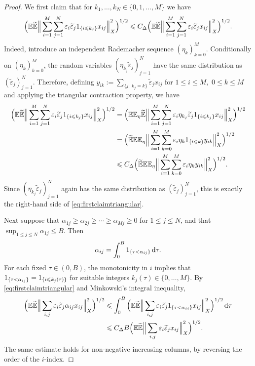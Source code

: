 \documentclass{amsart}
\let\leq\leqslant
\let\geq\geqslant
\theoremstyle{plain}
\theoremstyle{remark}
\theoremstyle{plain}
\numberwithin{equation}{section}
\newcommand{\E}{\mathbb E}
\newcommand{\1}{\mathbf 1}
\newcommand{\dd}{\,{\rm d}}
\newcommand{\wt}{\widetilde}
\begin{document}
\begin{proof}
We first claim that for  $k_1,\ldots,k_N\in\{0,1,\ldots,M\}$ we have 
\begin{equation}\label{eq:firstclaimtriangular}
       \Big(\E\wt{\E}\Big\|\sum_{i=1}^M\sum_{j=1}^N\varepsilon_i\wt{\varepsilon}_j\mathbf \1_{\{i\leq k_j\}}x_{ij}\Big\|_X^2\Big)^{1/2}
    \leq C_\Delta\Big(\E\wt{\E}\Big\| \sum_{i=1}^M\sum_{j=1}^N\varepsilon_i\wt{\varepsilon}_jx_{ij}\Big\|_X^2\Big)^{1/2}. 
\end{equation}
Indeed, introduce an independent Rademacher sequence
$(\eta_k)_{k=0}^M$. Conditionally on $(\eta_k)_{k=0}^M$, the random variables $(\eta_{k_j}\wt{\varepsilon}_j)_{j=1}^N$ have the same distribution as $(\wt{\varepsilon}_j)_{j=1}^N$. Therefore, defining
$y_{ik}:=\sum_{\{j:\ k_j=k\}}\wt{\varepsilon}_jx_{ij}$ for $1\leq i\leq M,$ $0\leq k\leq M$ and applying the triangular contraction property, we have
\begin{align*}
\Big(\E\wt{\E}\Big\|\sum_{i=1}^M\sum_{j=1}^N\varepsilon_i\wt{\varepsilon}_j\mathbf \1_{\{i\leq k_j\}}x_{ij}\Big\|_X^2\Big)^{1/2} &=\Big(\E\mathbb E_{\eta}\wt{\E}\Big\|\sum_{i=1}^M\sum_{j=1}^N           \varepsilon_i\eta_{k_j}\wt{\varepsilon}_j\mathbf \1_{\{i\leq k_j\}}x_{ij} \Big\|_X^2\Big)^{1/2}\\&= \Big(\wt{\E}\E\mathbb E_{\eta}\Big\|\sum_{i=1}^M\sum_{k=0}^M\varepsilon_i\eta_k\mathbf \1_{\{i\leq k\}}y_{ik}\Big\|_X^2\Big)^{1/2}\\&\leq C_\Delta
    \Big(\wt{\E}\E\mathbb E_{\eta} \Big\|\sum_{i=1}^M\sum_{k=0}^M\varepsilon_i\eta_k y_{ik}\Big\|_X^2\Big)^{1/2}.
\end{align*}
Since $(\eta_{k_j}\wt{\varepsilon}_j)_{j=1}^N$ again has the same distribution as
$(\wt{\varepsilon}_j)_{j=1}^N$, this is exactly the right-hand side of \eqref{eq:firstclaimtriangular}.

Next suppose that $\alpha_{1j}\geq \alpha_{2j}\geq\cdots\geq \alpha_{Mj}\geq 0$ for 
$1\leq j\leq N$, and that $\sup_{1\leq j\leq N} \alpha_{1j}\leq B$. Then
\[
    \alpha_{ij}=\int_0^B \mathbf \1_{\{\tau<\alpha_{ij}\}}\dd \tau.
\]
For each fixed $\tau \in (0,B)$, the monotonicity in $i$ implies that $\mathbf \1_{\{\tau<\alpha_{ij}\}}=\mathbf \1_{\{i\leq k_j(\tau)\}}$ for suitable integers $k_j(\tau)\in\{0,\ldots,M\}$. By \eqref{eq:firstclaimtriangular} and Minkowski's integral inequality,
\begin{align*}
    \Big(\E\wt{\E}\Big\|\sum_{i,j}\varepsilon_i\wt{\varepsilon}_j \alpha_{ij}x_{ij}\Big\|_X^2\Big)^{1/2}
    &\leq\int_0^B\Big(\E\wt{\E}\Big\|\sum_{i,j}\varepsilon_i\wt{\varepsilon}_j\mathbf \1_{\{\tau<\alpha_{ij}\}}x_{ij}\Big\|_X^2\Big)^{1/2}\dd \tau\\
    &\leq C_\Delta B\Big(\E\wt{\E}\Big\|\sum_{i,j}\varepsilon_i\wt{\varepsilon}_jx_{ij}\Big\|_X^2\Big)^{1/2}.
\end{align*}
The same estimate holds for non-negative increasing columns, by reversing the
order of the $i$-index.


\end{proof}
\end{document}
